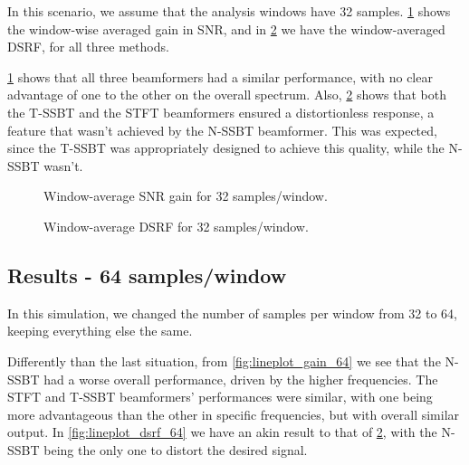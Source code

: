 In this scenario, we assume that the analysis windows have 32 samples. \cref{fig:lineplot_gain_32} shows the window-wise averaged gain in SNR, and in \cref{fig:lineplot_dsrf_32} we have the window-averaged DSRF, for all three methods.

\cref{fig:lineplot_gain_32} shows that all three beamformers had a similar performance, with no clear advantage of one to the other on the overall spectrum. Also, \cref{fig:lineplot_dsrf_32} shows that both the T-SSBT and the STFT beamformers ensured a distortionless response, a feature that wasn't achieved by the N-SSBT beamformer. This was expected, since the T-SSBT was appropriately designed to achieve this quality, while the N-SSBT wasn't.



%	
%	
%
\begin{figure}[H]
\centering

\caption{Window-average SNR gain for 32 samples/window.}
\label{fig:lineplot_gain_32}
\end{figure}

\begin{figure}[H]
	\centering
	
	\caption{Window-average DSRF for 32 samples/window.}
	\label{fig:lineplot_dsrf_32}
\end{figure}

%
%
\subsection{Results - 64 samples/window}

In this simulation, we changed the number of samples per window from 32 to 64, keeping everything else the same. 

Differently than the last situation, from \cref{fig:lineplot_gain_64} we see that the N-SSBT had a worse overall performance, driven by the higher frequencies. The STFT and T-SSBT beamformers' performances were similar, with one being more advantageous than the other in specific frequencies, but with overall similar output. In \cref{fig:lineplot_dsrf_64} we have an akin result to that of \cref{fig:lineplot_dsrf_32}, with the N-SSBT being the only one to distort the desired signal.

